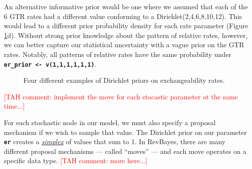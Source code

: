 \documentclass[11pt]{article}
\newcommand{\taha}[1]{{\textcolor{red}{[TAH comment: #1]}}} %
\newcommand{\cl}[1]{{\texttt{\textbf{#1}}}}
\begin{document}
An alternative informative prior would be one where we assumed that each of the 6 GTR rates had a different value conforming to a Dirichlet(2,4,6,8,10,12). 
This would lead to a different prior probability density for each rate parameter (Figure \ref{dirichletFig}d).
Without strong prior knowledge about the pattern of relative rates, however, we can better capture our statistical uncertainty with a vague prior on the GTR rates. 
Notably, all patterns of relative rates have the same probability under \cl{er\_prior <- v(1,1,1,1,1,1)}.
\begin{figure}[h]
\centering
{}
\caption{\small Four different examples of Dirichlet priors on exchangeability rates.}
\label{dirichletFig}
\end{figure}

\taha{implement the move for each stocastic parameter at the same time...}

For each stochastic node in our model, we must also specify a proposal mechanism if we wish to sample that value. 
The Dirichlet prior on our parameter \cl{er} creates a \href{http://en.wikipedia.org/wiki/Simplex}{\textit{simplex}} of values that sum to 1. 
In RevBayes, there are many different proposal mechanisms --- called ``moves'' --- and each move operates on a specific data type. \taha{more here...}
\end{document}
